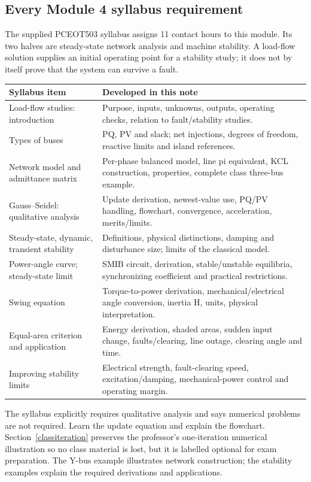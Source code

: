 \documentclass[11pt,a4paper]{article}
\newenvironment{Caution}[1]{\begin{tcolorbox}[colback=warm,colframe=rust,coltitle=white,title={#1}]}{\end{tcolorbox}}
\begin{document}
\subsection{Every Module 4 syllabus requirement}
The supplied PCEOT503 syllabus assigns 11 contact hours to this module. Its two halves are steady-state network analysis and machine stability. A load-flow solution supplies an initial operating point for a stability study; it does not by itself prove that the system can survive a fault.
\begin{center}\small\begin{tabularx}{\textwidth}{L{.37\textwidth}Y}
\toprule Syllabus item & Developed in this note\\\midrule
Load-flow studies: introduction & Purpose, inputs, unknowns, outputs, operating checks, relation to fault/stability studies.\\
Types of buses & PQ, PV and slack; net injections, degrees of freedom, reactive limits and island references.\\
Network model and admittance matrix & Per-phase balanced model, line pi equivalent, KCL construction, properties, complete class three-bus example.\\
Gauss--Seidel: qualitative analysis & Update derivation, newest-value use, PQ/PV handling, flowchart, convergence, acceleration, merits/limits.\\
Steady-state, dynamic, transient stability & Definitions, physical distinctions, damping and disturbance size; limits of the classical model.\\
Power-angle curve; steady-state limit & SMIB circuit, derivation, stable/unstable equilibria, synchronizing coefficient and practical restrictions.\\
Swing equation & Torque-to-power derivation, mechanical/electrical angle conversion, inertia H, units, physical interpretation.\\
Equal-area criterion and application & Energy derivation, shaded areas, sudden input change, faults/clearing, line outage, clearing angle and time.\\
Improving stability limits & Electrical strength, fault-clearing speed, excitation/damping, mechanical-power control and operating margin.\\\bottomrule
\end{tabularx}\end{center}
\begin{Caution}{Respect the syllabus boundary on Gauss--Seidel}
The syllabus explicitly requires qualitative analysis and says numerical problems are not required. Learn the update equation and explain the flowchart. Section~\ref{classiteration} preserves the professor's one-iteration numerical illustration so no class material is lost, but it is labelled optional for exam preparation. The Y-bus example illustrates network construction; the stability examples explain the required derivations and applications.
\end{Caution}
\end{document}
